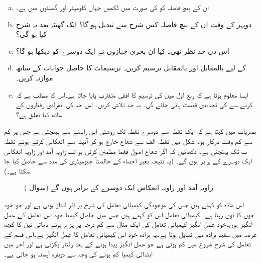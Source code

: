 \begin{enumerate}[a.]
\item
ان کے بیچ فاصلہ  کو  کی صورت میں لکھیں جہاں  کلومیٹر اور  گھنٹوں میں ہے۔
\item
دوپہر کے وقت ان کے بیچ فاصلہ کس شرح سے تبدیل ہو گا؟ ایک گھنٹہ بعد یہ شرح کیا ہو گی؟
\item
اس دن حد نظر  تھی۔ کیا ان بحری جہازوں نے ایک دوسرے کو دیکھا ہو گا؟ 
\item
{} کے لیے  بالمقابل  اور  بالمقابل  ترسیم کریں۔ ترسیمات کا حاصل جوابات کے ساتھ موازنہ کریں۔
\item
ایسا معلوم ہوتا ہے کہ ربع اول میں  کی ترسیم کا افقی متقارب پایا جاتا ہے۔اس کا مطلب ہے  کہ  کرنے سے  کی تحدیدی قیمت پائی جائے گی۔ یہ  حد  تلاش کریں۔ اس حد کی  انفرادی رفتاروں کے ساتھ کیا تعلق ہے؟
\end{enumerate}
بصریات میں  کہتا ہے کہ ایک نقطہ سے دوسرے نقطہ تک  روشنی اس راستے سے پہنچتی ہے جس پر کم سے کم وقت درکار ہو۔ شکل  میں نقطہ الف سے شعاع خارج ہو کر  آئینہ سے انعکاس کرتے ہوئے نقطہ ب تک پہنچتی ہے۔ دکھائیں کہ اگر شعاع اصول فغما   مطمئن کرتی  ہو تب زاویہ آمد اور زاویہ انعکاس ایک دوسرے کے برابر ہوں گے۔ (یہ نتیجہ بغیر احصاء کے خالصتاً جیومیٹری کی مدد سے حاصل کیا جا سکتا ہے۔)
\begin{figure}
\centering
{}
\caption{زاویہ آمد اور زاویہ انعکاس ایک دوسرے کے برابر ہوں گے (سوال )}
\label{شکل_سوال_استعمال_زاویہ_آمد_اور_انعکاس}
\end{figure}
%
\quad
{} اس مادّہ کو کہتے ہیں جس کی موجودگی کیمیائی تعامل کی شرح پر اثر انداز ہوتی ہے اور جو خود جوں کا توں رہتا ہے۔  کیمیائی تعامل اس کو کہتے ہیں جس میں حاصل کیمیا خود اس تعامل کے عمل انگیز ہوں۔خود عمل انگیز کیمیائی تعامل کی ایک مثال   سے کم درجہ پر پڑے  ہوئے دھاتی ٹین کا کچھ عرصہ میں سفید برادہ میں تبدیل ہونا ہے۔یہ برادہ خود اس کیمیائی تعامل کا عمل انگیز ہے۔اس  قسم کے تعامل کی شرح شروع میں کم ہوتی ہے جو عمل انگیز پیدا ہونے کے بعد رفتار پکڑتی ہے اور آخر میں ابتدائی کیمیا کم ہونے کی وجہ سے دوبارہ آہستہ ہو جاتی ہے۔
 
